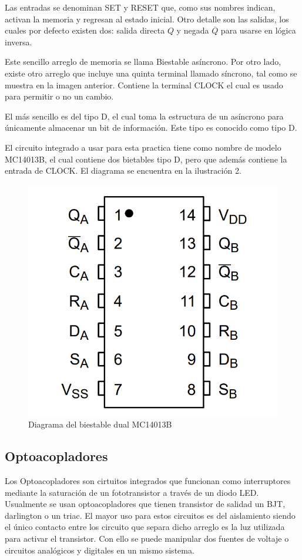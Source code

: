\documentclass{article}
\begin{document}
Las entradas se denominan SET y RESET que, como sus nombres indican, activan la memoria y regresan al estado inicial.
Otro detalle son las salidas, los cuales por defecto existen dos: salida directa \(Q\) y negada \(\overline{Q}\) para 
usarse en lógica inversa.

Este sencillo arreglo de memoria se llama Biestable asíncrono. Por otro lado, existe otro arreglo que incluye una quinta
terminal llamado síncrono, tal como se muestra en la imagen anterior. Contiene la terminal CLOCK el cual es usado para
permitir o no un cambio.

El más sencillo es del tipo D, el cual toma la estructura de un asíncrono para únicamente almacenar un bit de información.
Este tipo es conocido como tipo D. 

El circuito integrado a usar para esta practica tiene como nombre de modelo MC14013B, el cual contiene dos bietables tipo D, 
pero que además contiene la entrada de CLOCK. El diagrama se encuentra en la ilustración 2.

\begin{figure}
    \centering
    \includegraphics[scale=0.5]{MC14013B.png}
    \caption{Diagrama del biestable dual MC14013B}
    \label{Fig: Diagrama del biestable dual MC14013B}
\end{figure}

\subsection{Optoacopladores}
Los Optoacopladores son cirtuitos integrados que funcionan como interruptores mediante la saturación de un fototransistor
a través de un diodo LED. Usualmente se usan optoacopladores que tienen transistor de salidad un BJT, darlington o un triac.
El mayor uso para estos circuitos es del aislamiento siendo el único contacto entre los circuito que separa dicho arreglo
es la luz utilizada para activar el transistor. Con ello se puede manipular dos fuentes de voltaje o circuitos analógicos y 
digitales en un mismo sistema. \parencite{bera2012opto}
\end{document}
